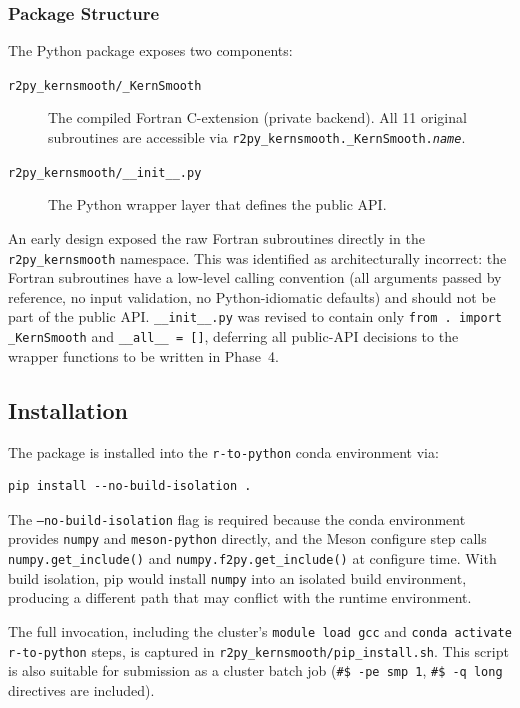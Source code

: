 \documentclass[12pt,a4paper]{article}
\begin{document}
\subsubsection{Package Structure}

The Python package exposes two components:

\begin{description}
  \item[\texttt{r2py\_kernsmooth/\_KernSmooth}] The compiled Fortran C-extension (private backend). All 11 original subroutines are accessible via \texttt{r2py\_kernsmooth.\_KernSmooth.\textit{name}}.
  \item[\texttt{r2py\_kernsmooth/\_\_init\_\_.py}] The Python wrapper layer that defines the public API.
\end{description}

An early design exposed the raw Fortran subroutines directly in the \texttt{r2py\_kernsmooth} namespace. This was identified as architecturally incorrect: the Fortran subroutines have a low-level calling convention (all arguments passed by reference, no input validation, no Python-idiomatic defaults) and should not be part of the public API. \texttt{\_\_init\_\_.py} was revised to contain only \texttt{from . import \_KernSmooth} and \texttt{\_\_all\_\_ = []}, deferring all public-API decisions to the wrapper functions to be written in Phase~4.

\subsection{Installation}

The package is installed into the \texttt{r-to-python} conda environment via:

\begin{lstlisting}[style=shell]
pip install --no-build-isolation .
\end{lstlisting}

The \texttt{--no-build-isolation} flag is required because the conda environment provides \texttt{numpy} and \texttt{meson-python} directly, and the Meson configure step calls \texttt{numpy.get\_include()} and \texttt{numpy.f2py.get\_include()} at configure time. With build isolation, pip would install \texttt{numpy} into an isolated build environment, producing a different path that may conflict with the runtime environment.

The full invocation, including the cluster's \texttt{module load gcc} and \texttt{conda activate r-to-python} steps, is captured in \texttt{r2py\_kernsmooth/pip\_install.sh}. This script is also suitable for submission as a cluster batch job (\texttt{\#\$ -pe smp 1}, \texttt{\#\$ -q long} directives are included).
\end{document}
